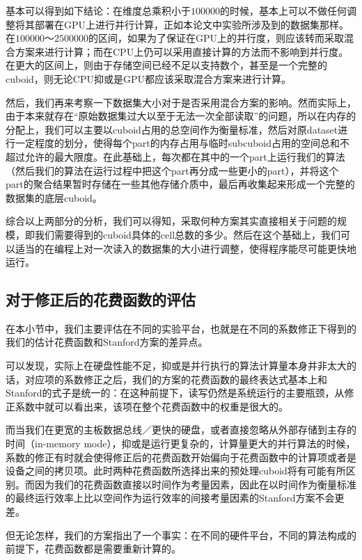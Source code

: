 基本可以得到如下结论：在维度总乘积小于$100000$的时候，基本上可以不做任何调整将其部署在GPU上进行并行计算，正如本论文中实验所涉及到的数据集那样。在$100000$～$2500000$的区间，如果为了保证在GPU上的并行度，则应该转而采取混合方案来进行计算；而在CPU上仍可以采用直接计算的方法而不影响到并行度。在更大的区间上，则由于存储空间已经不足以支持数个，甚至是一个完整的cuboid，则无论CPU抑或是GPU都应该采取混合方案来进行计算。

然后，我们再来考察一下数据集大小对于是否采用混合方案的影响。然而实际上，由于本来就存在“原始数据集过大以至于无法一次全部读取”的问题，所以在内存的分配上，我们可以主要以cuboid占用的总空间作为衡量标准，然后对原dataset进行一定程度的划分，使得每个part的内存占用与临时subcuboid占用的空间总和不超过允许的最大限度。在此基础上，每次都在其中的一个part上运行我们的算法（然后我们的算法在运行过程中把这个part再分成一些更小的part），并将这个part的聚合结果暂时存储在一些其他存储介质中，最后再收集起来形成一个完整的数据集的底层cuboid。

综合以上两部分的分析，我们可以得知，采取何种方案其实直接相关于问题的规模，即我们需要得到的cuboid具体的cell总数的多少。然后在这个基础上，我们可以适当的在编程上对一次读入的数据集的大小进行调整，使得程序能尽可能更快地运行。

\subsection{对于修正后的花费函数的评估}

在本小节中，我们主要评估在不同的实验平台，也就是在不同的系数修正下得到的我们的估计花费函数和Stanford方案的差异点。

可以发现，实际上在硬盘性能不足，抑或是并行执行的算法计算量本身并非太大的话，对应项的系数修正之后，我们的方案的花费函数的最终表达式基本上和Stanford的式子是统一的：在这种前提下，读写仍然是系统运行的主要瓶颈，从修正系数中就可以看出来，该项在整个花费函数中的权重是很大的。

而当我们在更宽的主板数据总线／更快的硬盘，或者直接忽略从外部存储到主存的时间（in-memory mode），抑或是运行更复杂的，计算量更大的并行算法的时候，系数的修正有时就会使得修正后的花费函数开始偏向于花费函数中的计算项或者是设备之间的拷贝项。此时两种花费函数所选择出来的预处理cuboid将有可能有所区别。而因为我们的花费函数直接以时间作为考量因素，因此在以时间作为衡量标准的最终运行效率上比以空间作为运行效率的间接考量因素的Stanford方案不会更差。

但无论怎样，我们的方案指出了一个事实：在不同的硬件平台，不同的算法构成的前提下，花费函数都是需要重新计算的。

